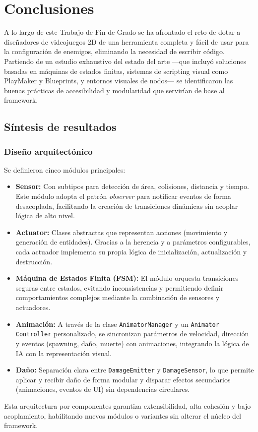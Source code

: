 \chapter{Conclusiones}

A lo largo de este Trabajo de Fin de Grado se ha afrontado el reto de dotar a diseñadores de videojuegos 2D de una herramienta completa y fácil de usar para la configuración de enemigos, eliminando la necesidad de escribir código. Partiendo de un estudio exhaustivo del estado del arte —que incluyó soluciones basadas en máquinas de estados finitas, sistemas de scripting visual como PlayMaker y Blueprints, y entornos visuales de nodos— se identificaron las buenas prácticas de accesibilidad y modularidad que servirían de base al framework.

\section{Síntesis de resultados}

\subsection{Diseño arquitectónico}
Se definieron cinco módulos principales:  
\begin{itemize}
  \item \textbf{Sensor:} Con subtipos para detección de área, colisiones, distancia y tiempo. Este módulo adopta el patrón \textit{observer} para notificar eventos de forma desacoplada, facilitando la creación de transiciones dinámicas sin acoplar lógica de alto nivel.  
  \item \textbf{Actuator:} Clases abstractas que representan acciones (movimiento y generación de entidades). Gracias a la herencia y a parámetros configurables, cada actuador implementa su propia lógica de inicialización, actualización y destrucción.  
  \item \textbf{Máquina de Estados Finita (FSM):} El módulo orquesta transiciones seguras entre estados, evitando inconsistencias y permitiendo definir comportamientos complejos mediante la combinación de sensores y actuadores.  
  \item \textbf{Animación:} A través de la clase \texttt{AnimatorManager} y un \texttt{Animator Controller} personalizado, se sincronizan parámetros de velocidad, dirección y eventos (spawning, daño, muerte) con animaciones, integrando la lógica de IA con la representación visual.  
  \item \textbf{Daño:} Separación clara entre \texttt{DamageEmitter} y \texttt{DamageSensor}, lo que permite aplicar y recibir daño de forma modular y disparar efectos secundarios (animaciones, eventos de UI) sin dependencias circulares.  
\end{itemize}
Esta arquitectura por componentes garantiza extensibilidad, alta cohesión y bajo acoplamiento, habilitando nuevos módulos o variantes sin alterar el núcleo del framework.

